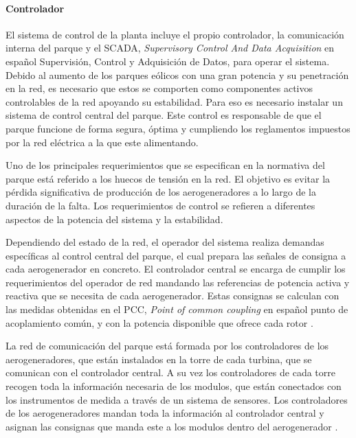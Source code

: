 \documentclass{book}
\begin{document}
		\paragraph {Controlador}
		El sistema de control de la planta incluye el propio controlador, la comunicaci\'on interna del parque y el SCADA, \emph{Supervisory Control And Data Acquisition} en español Supervisi\'on, Control y Adquisici\'on de Datos, para operar el sistema. Debido al aumento de los parques e\'olicos con una gran potencia y su penetraci\'on en la red, es necesario que estos se comporten como componentes activos controlables de la red apoyando su estabilidad. Para eso es necesario instalar un sistema de control central del parque. Este control es responsable de que el parque funcione de forma segura, \'optima y cumpliendo los reglamentos impuestos por la red el\'ectrica a la que este alimentando. \par
		Uno de los principales requerimientos que se especifican en la normativa del parque est\'a referido a los huecos de tensi\'on en la red. El objetivo es evitar la p\'erdida significativa de producci\'on de los aerogeneradores a lo largo de la duraci\'on de la falta. Los requerimientos de control se refieren a diferentes aspectos de la potencia del sistema y la estabilidad. \par 
		Dependiendo del estado de la red, el operador del sistema realiza demandas espec\'ificas al control central del parque, el cual prepara las señales de consigna a cada aerogenerador en concreto. El controlador central se encarga de cumplir los requerimientos del operador de red mandando las referencias de potencia activa y reactiva que se necesita de cada aerogenerador. Estas consignas se calculan con las medidas obtenidas en el PCC, \emph{Point of common coupling} en español punto de acoplamiento com\'un, y con la potencia disponible que ofrece cada rotor \cite{WindFarmController}.  \par
		La red de comunicaci\'on del parque est\'a formada por los controladores de los aerogeneradores, que est\'an instalados en la torre de cada turbina, que se comunican con el controlador central.  A su vez los controladores de cada torre recogen toda la informaci\'on necesaria de los modulos, que est\'an conectados con los instrumentos de medida a trav\'es de  un sistema de sensores. Los controladores de los aerogeneradores mandan toda la informaci\'on al controlador central y asignan las consignas que manda este a los modulos dentro del aerogenerador \cite{ComunicationControl}.  \par
\end{document}
